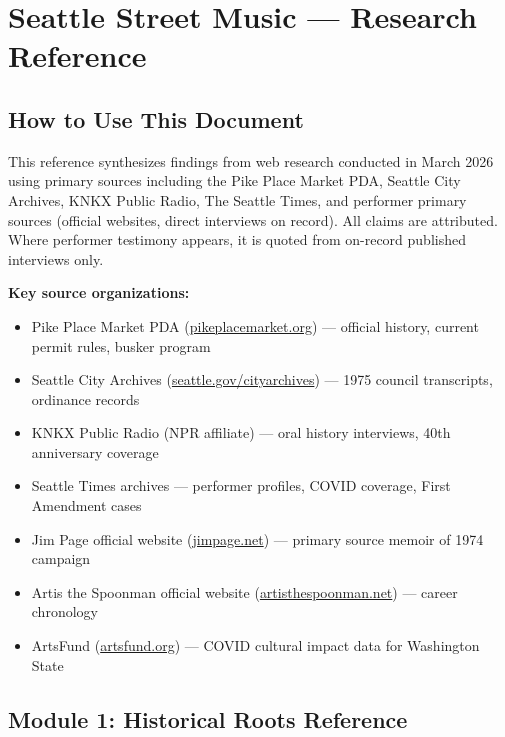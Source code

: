 \documentclass[11pt,letterpaper]{article}
\newcommand{\stageheader}[2]{%
  \noindent\colorbox{#2}{\makebox[\textwidth][l]{%
    \textcolor{white}{\bfseries\sffamily\hspace{6pt}#1\hspace{6pt}}}}%
  \vspace{0.5em}\par%
}
\begin{document}
\newpage

\stageheader{STAGE 2 --- RESEARCH REFERENCE}{secondary}

\section{Seattle Street Music --- Research Reference}

\subsection{How to Use This Document}

This reference synthesizes findings from web research conducted in March 2026 using primary sources including the Pike Place Market PDA, Seattle City Archives, KNKX Public Radio, The Seattle Times, and performer primary sources (official websites, direct interviews on record). All claims are attributed. Where performer testimony appears, it is quoted from on-record published interviews only.

\textbf{Key source organizations:}
\begin{itemize}[leftmargin=1.5em]
  \item Pike Place Market PDA (\url{pikeplacemarket.org}) --- official history, current permit rules, busker program
  \item Seattle City Archives (\url{seattle.gov/cityarchives}) --- 1975 council transcripts, ordinance records
  \item KNKX Public Radio (NPR affiliate) --- oral history interviews, 40th anniversary coverage
  \item Seattle Times archives --- performer profiles, COVID coverage, First Amendment cases
  \item Jim Page official website (\url{jimpage.net}) --- primary source memoir of 1974 campaign
  \item Artis the Spoonman official website (\url{artisthespoonman.net}) --- career chronology
  \item ArtsFund (\url{artsfund.org}) --- COVID cultural impact data for Washington State
\end{itemize}

\subsection{Module 1: Historical Roots Reference}
\end{document}
